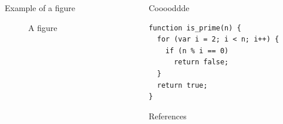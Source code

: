 \documentclass[dvipsnames, final]{beamer}
\newlength{\sepwidth}
\newlength{\colwidth}
\begin{document}
\begin{frame}[t,fragile]
\begin{columns}[t]
\begin{column}{\colwidth}
\begin{block}{Example of a figure}
  \begin{center}
    \begin{figure}
      \caption{A figure}
    \end{figure}
  \end{center}
\end{block}


\end{column}

\begin{column}{\sepwidth}\end{column}

\begin{column}{\colwidth}


\begin{block}{Cooooddde}
  \begin{verbatim}
function is_prime(n) {
  for (var i = 2; i < n; i++) {
    if (n % i == 0)
      return false;
  }
  return true;
}
  \end{verbatim}
\end{block}


\begin{block}{References}
  \nocite{*}
  
  
\end{block}


\end{column}

\end{columns}

\end{frame}
\end{document}
